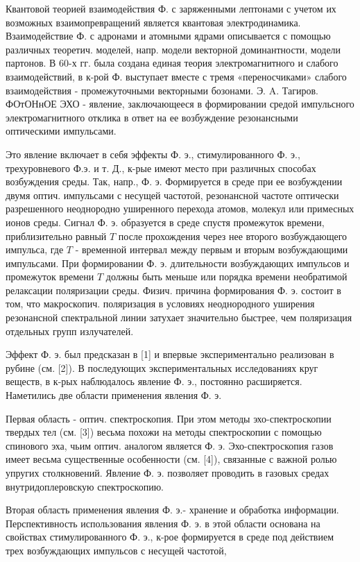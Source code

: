 \documentclass[10pt]{article}
\begin{document}
Квантовой теорией взаимодействия Ф. с заряженными лептонами с учетом их возможных взаимопревращений является квантовая электродинамика. Взаимодействие Ф. с адронами и атомными ядрами описывается с помощью различных теоретич. моделей, напр. модели векторной доминантности, модели партонов. В 60-х гг. была создана единая теория электромагнитного и слабого взаимодействий, в к-рой Ф. выступает вместе с тремя «переносчиками» слабого взаимодействия - промежуточными векторными бозонами. Э. A. Тагиров. ФОтОНнОЕ ЭХО - явление, заключающееся в формировании средой импульсного электромагнитного отклика в ответ на ее возбуждение резонансными оптическими импульсами.



Это явление включает в себя эффекты Ф. э., стимулированного Ф. э., трехуровневого Ф.э. и т. Д., к-рые имеют место при различных способах возбуждения среды. Так, напр., Ф. э. Формируется в среде при ее возбуждении двумя оптич. импульсами с несущей частотой, резонансной частоте оптически разрешенного неоднородно уширенного перехода атомов, молекул или примесных ионов среды. Сигнал Ф. э. образуется в среде спустя промежуток времени, приблизительно равный $T$ после прохождения через нее второго возбуждающего импульса, где $T$ - временной интервал между первым и вторым возбуждающими импульсами. При формировании Ф. э. длительности возбуждающих импульсов и промежуток времени $T$ должны быть меньше или порядка времени необратимой релаксации поляризации среды. Физич. причина формирования Ф. э. состоит в том, что макроскопич. поляризация в условиях неоднородного уширения резонансной спектральной линии затухает значительно быстрее, чем поляризация отдельных групп излучателей.



Эффект Ф. э. был предсказан в [1] и впервые экспериментально реализован в рубине (см. [2]). В последующих экспериментальных исследованиях круг веществ, в к-рых наблюдалось явление Ф. э., постоянно расширяется. Наметились две области применения явления Ф. э.



Первая область - оптич. спектроскопия. При этом методы эхо-спектроскопии твердых тел (см. [3]) весьма похожи на методы спектроскопии с помощью спинового эха, чьим оптич. аналогом является Ф. э. Эхо-спектроскопия газов имеет весьма существенные особенности (см. [4]), связанные с важной ролью упругих столкновений. Явление Ф. э. позволяет проводить в газовых средах внутридоплеровскую спектроскопию.



Вторая область применения явления Ф. э.- хранение и обработка информации. Перспективность использования явления Ф. э. в этой области основана на свойствах стимулированного Ф. э., к-рое формируется в среде под действием трех возбуждающих импульсов с несущей частотой,
\end{document}
